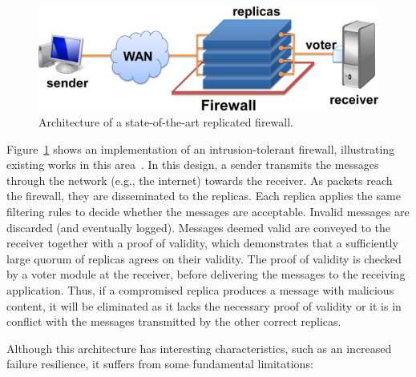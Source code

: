 \begin{figure}[t]
\begin{center}
\includegraphics[width=.8\columnwidth]{images/images/arch_traditional.pdf}
\caption{Architecture of a state-of-the-art replicated firewall.}
\label{fig:traditional}
\end{center}
\end{figure}

Figure~\ref{fig:traditional} shows an implementation of an intrusion-tolerant firewall, illustrating  existing works in this area~\cite{Sousa:2010,Roeder:2010}.
In this design, a sender transmits the messages through the network (e.g., the internet) towards the receiver.
As packets reach the firewall, they are disseminated to the replicas. 
Each replica applies the same filtering rules to decide whether the messages are acceptable. 
Invalid messages are discarded (and eventually logged). 
Messages deemed valid are conveyed to the receiver together with a proof of validity, which demonstrates that a sufficiently large quorum of replicas agrees on their validity.
The proof of validity is checked by a voter module at the receiver, before delivering the messages to the receiving application.
Thus, if a compromised replica produces a message with malicious content, it will be eliminated as it lacks the necessary proof of validity or it is in conflict with the messages transmitted by the other correct replicas.

Although this architecture has interesting characteristics, such as an increased failure resilience, it suffers from some fundamental limitations:

